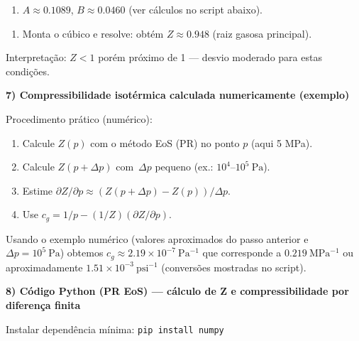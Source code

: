 \documentclass[11pt,a4paper]{article}
\begin{document}
\begin{enumerate}
\item $A\approx 0.1089$, $B\approx 0.0460$ (ver cálculos no script abaixo).
\end{enumerate}

\begin{enumerate}
\item Monta o cúbico e resolve: obtém $Z\approx 0.948$ (raiz gasosa principal).
\end{enumerate}

Interpretação: $Z<1$ porém próximo de 1 — desvio moderado para estas condições.

\textbf{7) Compressibilidade isotérmica calculada numericamente (exemplo)}

Procedimento prático (numérico):
\begin{enumerate}
\item Calcule $Z(p)$ com o método EoS (PR) no ponto $p$ (aqui 5 MPa).
\item Calcule $Z(p+\Delta p)$ com $\,\Delta p$ pequeno (ex.: $10^4$–$10^5\ \mathrm{Pa}$).  
\item Estime $\partial Z/\partial p \approx (Z(p+\Delta p)-Z(p))/\Delta p$.  
\item Use $c_g = 1/p - (1/Z) (\partial Z/\partial p)$.
\end{enumerate}

Usando o exemplo numérico (valores aproximados do passo anterior e $\Delta p=10^5\ \mathrm{Pa}$) obtemos $c_g\approx 2.19\times10^{-7}\ \mathrm{Pa^{-1}}$ que corresponde a $0.219\ \mathrm{MPa^{-1}}$ ou aproximadamente $1.51\times10^{-3}\ \mathrm{psi^{-1}}$ (conversões mostradas no script).

\textbf{8) Código Python (PR EoS) — cálculo de Z e compressibilidade por diferença finita}

Instalar dependência mínima: \texttt{pip install numpy}
\end{document}
